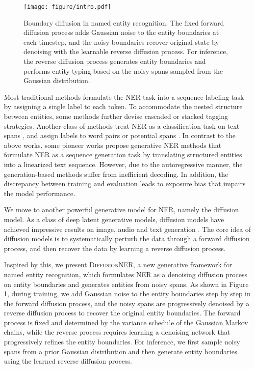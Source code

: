 \documentclass[11pt]{article}
\begin{document}
\begin{figure}
    \centering
    \texttt{[image: figure/intro.pdf]}
    \caption{Boundary diffusion in named entity recognition. The fixed forward diffusion process adds Gaussian noise to the entity boundaries at each timestep, and the noisy boundaries recover original state by denoising with the learnable reverse diffusion process. For inference, the reverse diffusion process generates entity boundaries and performs entity typing based on the noisy spans sampled from the  Gaussian distribution.}
    \label{fig:intro}
\end{figure}


Most traditional methods \citep{10.1162/tacl_a_00104} formulate the NER task into a sequence labeling task by assigning a single label to each token.
To accommodate the nested structure between entities, some methods \citep{ju-etal-2018-neural, wang-etal-2020-pyramid} further devise cascaded or stacked tagging strategies.
Another class of methods treat  NER as a classification task on text spans \citep{sohrab-miwa-2018-deep, Eberts}, and assign labels to word pairs \citep{yu-etal-2020-named, li2022unified} or potential spans \citep{lin-etal-2019-sequence, shen-etal-2021-locate}. In contrast to the above works, some pioneer works \citep{paolini2021structured, yan-etal-2021-unified-generative, lu-etal-2022-unified} propose generative NER methods that formulate NER as a sequence generation task by translating structured entities into a linearized text sequence. However, due to the autoregressive manner, the generation-based methods suffer from inefficient decoding. In addition, the discrepancy between training and evaluation leads to exposure bias that impairs the model performance.



We move to another powerful generative model for NER, namely the diffusion model. As a class of deep latent generative models, diffusion models have achieved impressive results on image, audio and text generation \citep{rombach2021highresolution, dalle2, kong2021diffwave, Li-2022-DiffusionLM, gong2022diffuseq}. The core idea of diffusion models is to systematically perturb the data through a forward diffusion process, and then recover the data by learning a reverse diffusion process. 


Inspired by this, we present \textsc{DiffusionNER}, a new generative framework for named entity recognition, which formulates NER as a denoising diffusion process \citep{pmlr-v37-sohl-dickstein15, ddpm} on entity boundaries and generates entities from noisy spans. As shown in Figure \ref{fig:intro}, during training, we add Gaussian noise to the entity boundaries step by step in the forward diffusion process, and the noisy spans are progressively denoised by a reverse diffusion process to recover the original entity boundaries. The forward process is fixed and determined by the variance schedule of the Gaussian Markov chains, while the reverse process requires learning a denoising network that progressively refines the entity boundaries. For inference, we first sample noisy spans from a prior Gaussian distribution and then generate entity boundaries using the learned reverse diffusion process.
\end{document}

